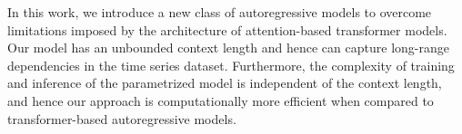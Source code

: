 In this work, we introduce a new class of autoregressive models to overcome limitations imposed by the architecture of attention-based transformer models. Our model has an unbounded context length and hence can capture long-range dependencies in the time series dataset. Furthermore, the complexity of training and inference of the parametrized model is independent of the context length, and hence our approach is computationally more efficient when compared to transformer-based autoregressive models.
